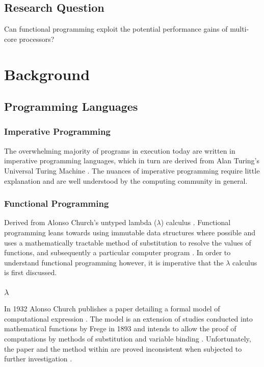 \documentclass[12pt,a4paper]{article}
\begin{document}
\subsection{Research Question}

Can functional programming exploit the potential performance gains of multi-core processors? 

\newpage
\section{Background}

\subsection{Programming Languages}

\subsubsection{Imperative Programming}

The overwhelming majority of programs in execution today are written in imperative programming languages, which in turn are derived from Alan Turing's Universal Turing Machine \cite{turing1936,ImperativeFunctional}. The nuances of imperative programming require little explanation and are well understood by the computing community in general.

\subsubsection{Functional Programming}

Derived from Alonso Church's untyped lambda ($\lambda$) calculus \cite{church1936}. Functional programming leans towards using immutable data structures where possible and uses a mathematically tractable method of substitution to resolve the values of functions, and subsequently a particular computer program  \cite{structureAndInterpretation,ImperativeFunctional}. In order to understand functional programming however, it is imperative that the $\lambda$ calculus is first discussed.

\subsubsection{$\lambda$}

In 1932 Alonso Church publishes a paper detailing a formal model of computational expression \cite{church1932}. The model is an extension of studies conducted into mathematical functions by Frege in 1893 and intends to allow the proof of computations by methods of substitution and variable binding \cite{lambdaHighlights}. Unfortunately, the paper and the method within are proved inconsistent when subjected to further investigation \cite{lambdaHighlights}.
\end{document}
